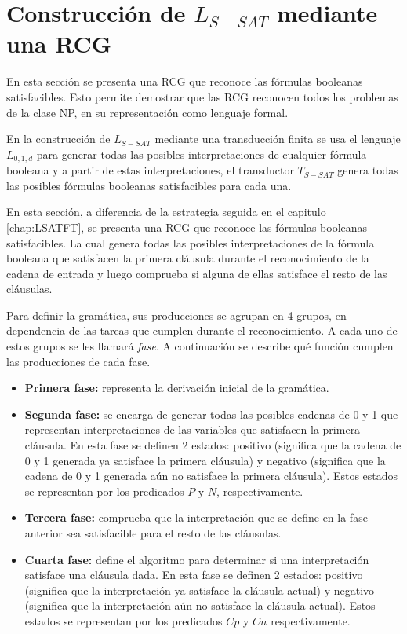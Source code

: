 \section{Construcción de $L_{S-SAT}$ mediante una RCG}

En esta sección se presenta una RCG que reconoce las fórmulas booleanas satisfacibles. Esto permite demostrar 
que las RCG reconocen todos los problemas de la clase NP, en su representación como lenguaje formal.

En la construcción de $L_{S-SAT}$ mediante una transducción finita se usa el lenguaje $L_{0,1,d}$ para generar todas las posibles interpretaciones de cualquier fórmula booleana y a partir de estas interpretaciones, el transductor $T_{S-SAT}$ genera todas las posibles fórmulas booleanas satisfacibles para cada una. 

En esta sección, a diferencia de la estrategia seguida en el capitulo \ref{chap:LSATFT}, se presenta una RCG que reconoce las fórmulas booleanas satisfacibles. La cual genera todas las posibles interpretaciones de la fórmula booleana que satisfacen la primera cláusula durante el reconocimiento de la cadena de entrada y luego comprueba si alguna de ellas satisface el resto de las cláusulas.

Para definir la gramática, sus producciones se agrupan en 4 grupos, en dependencia de las tareas que cumplen durante el reconocimiento. A cada uno de estos grupos se les llamará \textit{fase}. A continuación se describe qué función cumplen las producciones de cada fase.

\begin{itemize}
    \item \textbf{Primera fase:} representa la derivación inicial de la gramática.
    \item \textbf{Segunda fase:} se encarga de generar todas las posibles cadenas de 0 y 1 que representan interpretaciones de las variables que satisfacen la primera cláusula. En esta fase se definen 2 estados: positivo (significa que la cadena de 0 y 1 generada ya satisface la primera cláusula) y negativo (significa que la cadena de 0 y 1 generada aún no satisface la primera cláusula). Estos estados se representan por los predicados $P$ y $N$, respectivamente.
    \item \textbf{Tercera fase:} comprueba que la interpretación que se define en la fase anterior sea satisfacible para el resto de las cláusulas.
    \item \textbf{Cuarta fase:} define el algoritmo para determinar si una interpretación satisface una cláusula dada. En esta fase se definen 2 estados: positivo (significa que la interpretación ya satisface la cláusula actual) y negativo (significa que la interpretación aún no satisface la cláusula actual). Estos estados se representan por los predicados $Cp$ y $Cn$ respectivamente.
\end{itemize}

